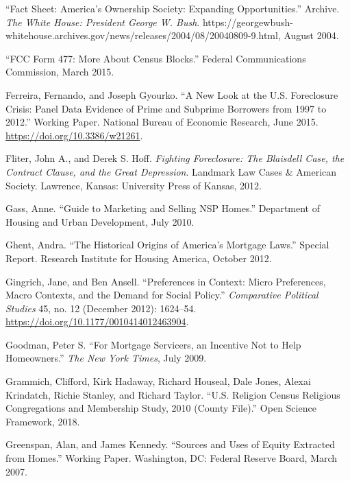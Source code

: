 \documentclass[12pt,oneside]{psthesis}
\begin{document}
\leavevmode\hypertarget{ref-2004fact}{}%
``Fact Sheet: America's Ownership Society: Expanding Opportunities.'' Archive. \emph{The White House: President George W. Bush}. https://georgewbush-whitehouse.archives.gov/news/releases/2004/08/20040809-9.html, August 2004.

\leavevmode\hypertarget{ref-2015fcc}{}%
``FCC Form 477: More About Census Blocks.'' Federal Communications Commission, March 2015.

\leavevmode\hypertarget{ref-ferreira2015new}{}%
Ferreira, Fernando, and Joseph Gyourko. ``A New Look at the U.S. Foreclosure Crisis: Panel Data Evidence of Prime and Subprime Borrowers from 1997 to 2012.'' Working Paper. National Bureau of Economic Research, June 2015. \url{https://doi.org/10.3386/w21261}.

\leavevmode\hypertarget{ref-fliter2012fighting}{}%
Fliter, John A., and Derek S. Hoff. \emph{Fighting Foreclosure: The Blaisdell Case, the Contract Clause, and the Great Depression}. Landmark Law Cases \& American Society. Lawrence, Kansas: University Press of Kansas, 2012.

\leavevmode\hypertarget{ref-gass2010guide}{}%
Gass, Anne. ``Guide to Marketing and Selling NSP Homes.'' Department of Housing and Urban Development, July 2010.

\leavevmode\hypertarget{ref-ghent2012historical}{}%
Ghent, Andra. ``The Historical Origins of America's Mortgage Laws.'' Special Report. Research Institute for Housing America, October 2012.

\leavevmode\hypertarget{ref-gingrich2012preferences}{}%
Gingrich, Jane, and Ben Ansell. ``Preferences in Context: Micro Preferences, Macro Contexts, and the Demand for Social Policy.'' \emph{Comparative Political Studies} 45, no. 12 (December 2012): 1624--54. \url{https://doi.org/10.1177/0010414012463904}.

\leavevmode\hypertarget{ref-goodman2009mortgage}{}%
Goodman, Peter S. ``For Mortgage Servicers, an Incentive Not to Help Homeowners.'' \emph{The New York Times}, July 2009.

\leavevmode\hypertarget{ref-grammich2018religion}{}%
Grammich, Clifford, Kirk Hadaway, Richard Houseal, Dale Jones, Alexai Krindatch, Richie Stanley, and Richard Taylor. ``U.S. Religion Census Religious Congregations and Membership Study, 2010 (County File).'' Open Science Framework, 2018.

\leavevmode\hypertarget{ref-greenspan2007sources}{}%
Greenspan, Alan, and James Kennedy. ``Sources and Uses of Equity Extracted from Homes.'' Working Paper. Washington, DC: Federal Reserve Board, March 2007.
\end{document}
